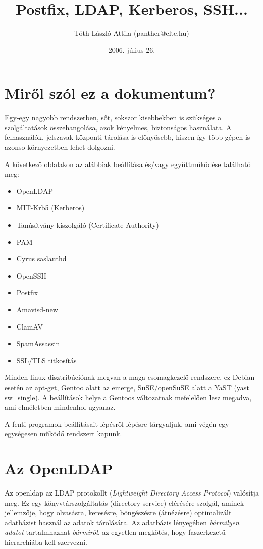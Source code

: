 \documentclass[fleqn,10pt,a4paper,titlepage]{article}
\title{Postfix, LDAP, Kerberos, SSH...}
\author{Tóth László Attila (panther@elte.hu)}
\date{2006. július 26.}
\newcommand{\mktoc}{
  \pagenumbering{roman}
  \setcounter{page}{1}
  \lhead{\textbf{\thepage}}
  \cfoot{}
  \tableofcontents
  \newpage
  \lhead{\textbf{\thepage}}
  \pagenumbering{arabic}
  \setcounter{page}{1}
}
\begin{document}
  \maketitle
  \mktoc
  \newpage
  \section{Miről szól ez a dokumentum?}
  Egy-egy nagyobb rendszerben, sőt, sokszor kisebbekben is szükséges a szolgáltatások összehangolása, azok kényelmes,
  biztonságos használata. A felhasználók, jelszavak központi tárolása is előnyösebb, hiszen így több gépen is azonso
  környezetben lehet dolgozni.

  A következő oldalakon az alábbiak beállítása és/vagy együttműködése található meg:
  \begin{itemize}
  \item OpenLDAP
  \item MIT-Krb5 (Kerberos)
  \item Tanúsítvány-kiszolgáló (Certificate Authority)
  \item PAM
  \item Cyrus saslauthd
  \item OpenSSH
  \item Postfix
  \item Amavisd-new
  \item ClamAV
  \item SpamAssassin
  \item SSL/TLS titkosítás
  \end{itemize}
  
  Minden linux disztribúciónak megvan a maga csomagkezelő rendszere, ez Debian esetén az apt-get, Gentoo alatt az
  emerge, SuSE/openSuSE alatt a YaST (yast sw\_single). A beállítások helye a Gentoos változatnak mefelelően lesz
  megadva, ami elméletben mindenhol ugyanaz.

  A fenti programok beállításait lépésről lépésre tárgyaljuk, ami végén egy egységesen működő rendszert kapunk.
  
  \newpage
  \section{Az OpenLDAP}
  Az openldap az LDAP protokollt ({\em Lightweight Directory Access Protocol}) valósítja meg. Ez egy könyvtárszolgáltatás
  (directory service) elérésére szolgál, aminek jellemzője, hogy olvasásra, keresésre, böngészésre (átnézésre)
  optimalizált adatbázist használ az adatok tárolására. Az adatbázis lényegében \emph{bármilyen adatot} tartalmhazhat
  \emph{bármiről}, az egyetlen megkötés, hogy faszerkezetű hierarchiába kell szervezni.
\end{document}

